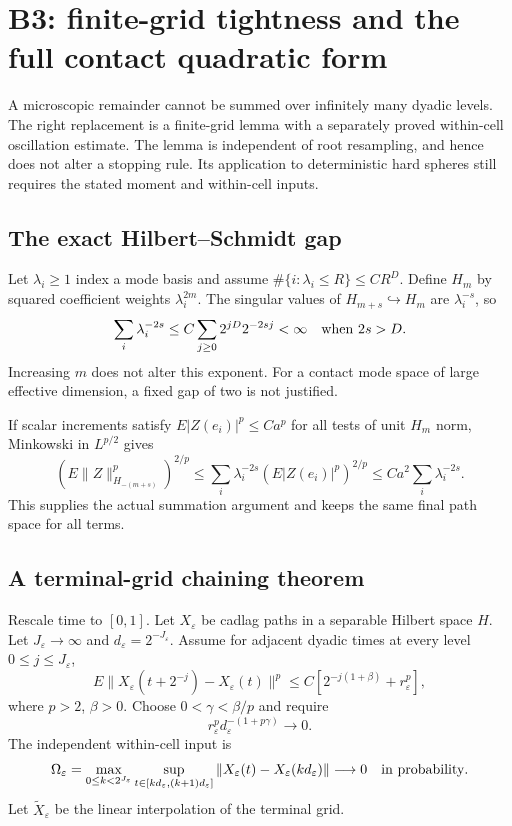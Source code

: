 \section{B3: finite-grid tightness and the full contact quadratic form}
\label{sec:r33-b3}

A microscopic remainder cannot be summed over infinitely many dyadic levels. The right replacement is a finite-grid lemma with a separately proved within-cell oscillation estimate. The lemma is independent of root resampling, and hence does not alter a stopping rule. Its application to deterministic hard spheres still requires the stated moment and within-cell inputs.

\subsection{The exact Hilbert--Schmidt gap}
Let $\lambda_i\ge1$ index a mode basis and assume $\#\{i:\lambda_i\le R\}\le CR^D$. Define $H_m$ by squared coefficient weights $\lambda_i^{2m}$. The singular values of $H_{m+s}\hookrightarrow H_m$ are $\lambda_i^{-s}$, so
\[
 \sum_i\lambda_i^{-2s}
 \le C\sum_{j\ge0}2^{jD}2^{-2sj}<\infty\quad\hbox{when }2s>D.
\]
Increasing $m$ does not alter this exponent. For a contact mode space of large effective dimension, a fixed gap of two is not justified.

If scalar increments satisfy $E|Z(e_i)|^p\le C a^p$ for all tests of unit $H_m$ norm, Minkowski in $L^{p/2}$ gives
\[
 (E\|Z\|_{H_{-(m+s)}}^p)^{2/p}
 \le\sum_i\lambda_i^{-2s}(E|Z(e_i)|^p)^{2/p}
 \le C a^2\sum_i\lambda_i^{-2s}.
\]
This supplies the actual summation argument and keeps the same final path space for all terms.

\subsection{A terminal-grid chaining theorem}
Rescale time to $[0,1]$. Let $X_\varepsilon$ be cadlag paths in a separable Hilbert space $H$. Let $J_\varepsilon\to\infty$ and $d_\varepsilon=2^{-J_\varepsilon}$. Assume for adjacent dyadic times at every level $0\le j\le J_\varepsilon$,
\begin{equation}\label{eq:r33-b3-moment}
 E\|X_\varepsilon(t+2^{-j})-X_\varepsilon(t)\|^p
 \le C[2^{-j(1+\beta)}+r_\varepsilon^p],
\end{equation}
where $p>2$, $\beta>0$. Choose $0<\gamma<\beta/p$ and require
\begin{equation}\label{eq:r33-b3-budget}
 r_\varepsilon^p d_\varepsilon^{-(1+p\gamma)}\longrightarrow0.
\end{equation}
The independent within-cell input is
\begin{equation}\label{eq:r33-b3-cell}
 \Omega_\varepsilon=
 \max_{0\le k<2^{J_\varepsilon}}
 \sup_{t\in[kd_\varepsilon,(k+1)d_\varepsilon]}
 \|X_\varepsilon(t)-X_\varepsilon(kd_\varepsilon)\|
 \longrightarrow0\quad\hbox{in probability}.
\end{equation}
Let $\widetilde X_\varepsilon$ be the linear interpolation of the terminal grid.

